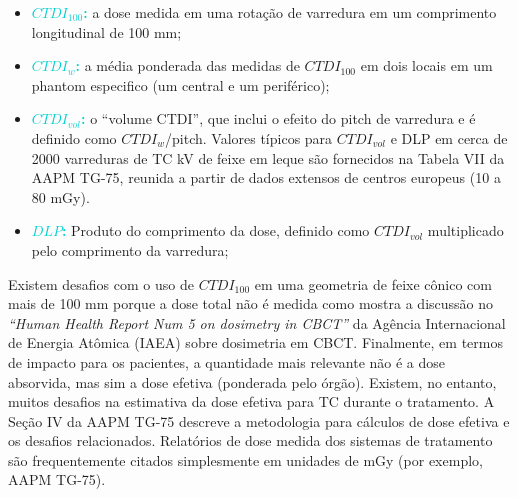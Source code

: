 \documentclass[11pt,a4paper]{article}
\newcounter{exemplo}
\begin{document}
    \begin{itemize}[label=\textcolor{CarnationPink}{$\blacksquare$}]
        \item \textcolor{DarkTurquoise}{\textbf{$CTDI_{100}$:}} a dose medida em uma rotação de varredura em um comprimento longitudinal de 100 mm;
        \item \textcolor{DarkTurquoise}{\textbf{$CTDI_{w}$:}} a média ponderada das medidas de $CTDI_{100}$ em dois locais em um phantom especifico (um central e um periférico);
        \item \textcolor{DarkTurquoise}{\textbf{$CTDI_{vol}$:}} o “volume CTDI”, que inclui o efeito do pitch de varredura e é definido como $CTDI_{w}$/pitch. Valores típicos para $CTDI_{vol}$ e DLP em cerca de 2000 varreduras de TC kV de feixe em leque  são fornecidos na Tabela VII da AAPM TG-75, reunida a partir de dados extensos de centros europeus (10 a 80 mGy).
        \item \textcolor{DarkTurquoise}{\textbf{$DLP$:}} Produto do comprimento da dose, definido como $CTDI_{vol}$ multiplicado pelo comprimento da varredura;
    \end{itemize}

    Existem desafios com o uso de $CTDI_{100}$ em uma geometria de feixe cônico com mais de 100 mm porque a dose total não é medida como mostra a discussão no  \textit{``Human Health Report Num 5 on dosimetry in CBCT''} da Agência Internacional de Energia Atômica (IAEA) sobre dosimetria em CBCT. Finalmente, em termos de impacto para os pacientes, a quantidade mais relevante não é a dose absorvida, mas sim a dose efetiva (ponderada pelo órgão). Existem, no entanto, muitos desafios na estimativa da dose efetiva para TC durante o tratamento. A Seção IV da AAPM TG-75 descreve a metodologia para cálculos de dose efetiva e os desafios relacionados. Relatórios de dose medida dos sistemas de tratamento são frequentemente citados simplesmente em unidades de mGy (por exemplo, AAPM TG-75).
\end{document}
